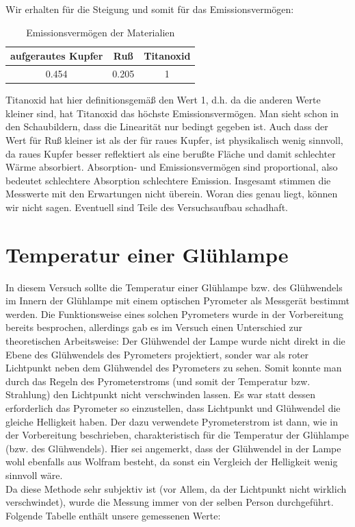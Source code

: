 \documentclass[12pt,twoside,a4paper]{article}
\begin{document}
	Wir erhalten für die Steigung und somit für das Emissionsvermögen:
	
\begin{table}[H]
\centering
\caption{Emissionsvermögen der Materialien}
	\begin{tabular}{c|c|c}
   aufgerautes Kupfer & Ruß & Titanoxid\\
		\hline
	 0.454 & 0.205 & 1
	\end{tabular}
\end{table}

Titanoxid hat hier definitionsgemäß den Wert 1, d.h. da die anderen Werte kleiner sind, hat Titanoxid das höchste Emissionsvermögen. Man sieht schon in den Schaubildern, dass die Linearität nur bedingt gegeben ist. Auch dass der Wert für Ruß kleiner ist als der für raues Kupfer, ist physikalisch wenig sinnvoll, da raues Kupfer besser reflektiert als eine berußte Fläche und damit schlechter Wärme absorbiert. Absorption- und Emissionsvermögen sind proportional, also bedeutet schlechtere Absorption schlechtere Emission. Insgesamt stimmen die Messwerte mit den Erwartungen nicht überein. Woran dies genau liegt, können wir nicht sagen. Eventuell sind Teile des Versuchsaufbau schadhaft.

\section{Temperatur einer Glühlampe}

In diesem Versuch sollte die Temperatur einer Glühlampe bzw. des Glühwendels im Innern der Glühlampe mit einem optischen Pyrometer als Messgerät bestimmt werden. Die Funktionsweise eines solchen Pyrometers wurde in der Vorbereitung bereits besprochen, allerdings gab es im Versuch einen Unterschied zur theoretischen Arbeitsweise: Der Glühwendel der Lampe wurde nicht direkt in die Ebene des Glühwendels des Pyrometers projektiert, sonder war als roter Lichtpunkt neben dem Glühwendel des Pyrometers zu sehen. Somit konnte man durch das Regeln des Pyrometerstroms (und somit der Temperatur bzw. Strahlung) den Lichtpunkt nicht verschwinden lassen. Es war statt dessen erforderlich das Pyrometer so einzustellen, dass Lichtpunkt und Glühwendel die gleiche Helligkeit haben. Der dazu verwendete Pyrometerstrom ist dann, wie in der Vorbereitung beschrieben, charakteristisch für die Temperatur der Glühlampe (bzw. des Glühwendels). Hier sei angemerkt, dass der Glühwendel in der Lampe wohl ebenfalls aus Wolfram besteht, da sonst ein Vergleich der Helligkeit wenig sinnvoll wäre.\\
Da diese Methode sehr subjektiv ist (vor Allem, da der Lichtpunkt nicht wirklich verschwindet), wurde die Messung immer von der selben Person durchgeführt. Folgende Tabelle enthält unsere gemessenen Werte:
\end{document}
